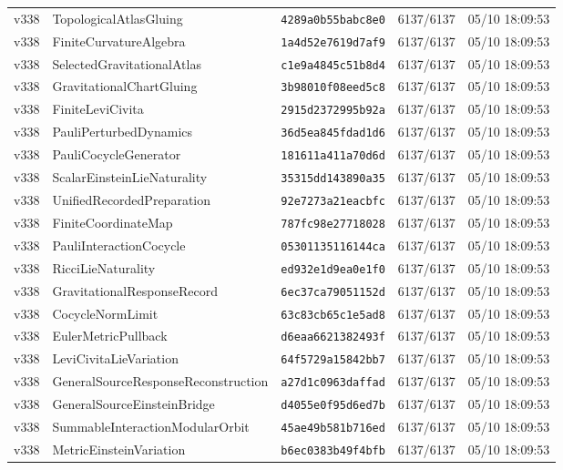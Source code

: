 \documentclass[11pt]{article}
\theoremstyle{definition}\newtheorem{deriv}{Derivation}
\begin{document}
{\begin{longtable}{@{}lllll@{}}
v338 & TopologicalAtlasGluing & \texttt{4289a0b55babc8e0} & 6137/6137 & 05/10 18:09:53 \\
v338 & FiniteCurvatureAlgebra & \texttt{1a4d52e7619d7af9} & 6137/6137 & 05/10 18:09:53 \\
v338 & SelectedGravitationalAtlas & \texttt{c1e9a4845c51b8d4} & 6137/6137 & 05/10 18:09:53 \\
v338 & GravitationalChartGluing & \texttt{3b98010f08eed5c8} & 6137/6137 & 05/10 18:09:53 \\
v338 & FiniteLeviCivita & \texttt{2915d2372995b92a} & 6137/6137 & 05/10 18:09:53 \\
v338 & PauliPerturbedDynamics & \texttt{36d5ea845fdad1d6} & 6137/6137 & 05/10 18:09:53 \\
v338 & PauliCocycleGenerator & \texttt{181611a411a70d6d} & 6137/6137 & 05/10 18:09:53 \\
v338 & ScalarEinsteinLieNaturality & \texttt{35315dd143890a35} & 6137/6137 & 05/10 18:09:53 \\
v338 & UnifiedRecordedPreparation & \texttt{92e7273a21eacbfc} & 6137/6137 & 05/10 18:09:53 \\
v338 & FiniteCoordinateMap & \texttt{787fc98e27718028} & 6137/6137 & 05/10 18:09:53 \\
v338 & PauliInteractionCocycle & \texttt{05301135116144ca} & 6137/6137 & 05/10 18:09:53 \\
v338 & RicciLieNaturality & \texttt{ed932e1d9ea0e1f0} & 6137/6137 & 05/10 18:09:53 \\
v338 & GravitationalResponseRecord & \texttt{6ec37ca79051152d} & 6137/6137 & 05/10 18:09:53 \\
v338 & CocycleNormLimit & \texttt{63c83cb65c1e5ad8} & 6137/6137 & 05/10 18:09:53 \\
v338 & EulerMetricPullback & \texttt{d6eaa6621382493f} & 6137/6137 & 05/10 18:09:53 \\
v338 & LeviCivitaLieVariation & \texttt{64f5729a15842bb7} & 6137/6137 & 05/10 18:09:53 \\
v338 & GeneralSourceResponseReconstruction & \texttt{a27d1c0963daffad} & 6137/6137 & 05/10 18:09:53 \\
v338 & GeneralSourceEinsteinBridge & \texttt{d4055e0f95d6ed7b} & 6137/6137 & 05/10 18:09:53 \\
v338 & SummableInteractionModularOrbit & \texttt{45ae49b581b716ed} & 6137/6137 & 05/10 18:09:53 \\
v338 & MetricEinsteinVariation & \texttt{b6ec0383b49f4bfb} & 6137/6137 & 05/10 18:09:53 \\

\end{longtable}}
\end{document}

